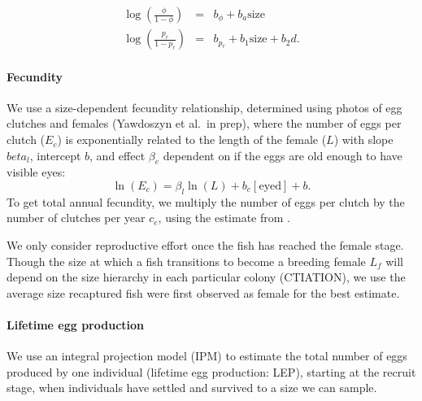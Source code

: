 \documentclass[12pt, oneside]{article}   	%
\begin{document}
\begin{eqnarray}
\log(\frac{\phi}{1-\phi}) &=& b_\phi + b_a\text{size} \\
\log(\frac{p_r}{1-p_r}) &=& b_{p_r} + b_1\text{size} + b_2d. \label{EQN_Survival}
\end{eqnarray}

\paragraph*{Fecundity}

We use a size-dependent fecundity relationship, determined using photos of egg clutches and females (Yawdoszyn et al.\ in prep), where the number of eggs per clutch ($E_c$) is exponentially related to the length of the female ($L$) with slope $beta_l$, intercept $b$, and effect $\beta_e$ dependent on if the eggs are old enough to have visible eyes: 
\begin{equation} %
\ln(E_c) = \beta_l\ln(L) + b_e[\text{eyed}] + b. \label{EQN_Fec}
\end{equation}
To get total annual fecundity, we multiply the number of eggs per clutch by the number of clutches per year $c_e$, using the estimate from \cite{holtswarth2017fecundity}.

We only consider reproductive effort once the fish has reached the female stage. Though the size at which a fish transitions to become a breeding female $L_f$ will depend on the size hierarchy in each particular colony (CTIATION), we use the average size recaptured fish were first observed as female for the best estimate. 


\paragraph*{Lifetime egg production}
We use an integral projection model (IPM) \citep[e.g.][]{rees2014building} to estimate the total number of eggs produced by one individual (lifetime egg production: LEP), starting at the recruit stage, when individuals have settled and survived to a size we can sample.
\end{document}
